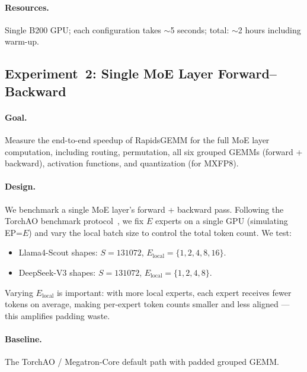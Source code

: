 \documentclass[11pt,a4paper]{article}
\theoremstyle{definition}
\begin{document}
\paragraph{Resources.}
Single B200 GPU; each configuration takes $\sim$5 seconds;
total: $\sim$2 hours including warm-up.

\subsection{Experiment~2: Single MoE Layer Forward--Backward}
\label{sec:exp-layer}

\paragraph{Goal.}
Measure the end-to-end speedup of RapidsGEMM for the full MoE layer
computation, including routing, permutation, all six grouped GEMMs
(forward + backward), activation functions, and quantization
(for MXFP8).

\paragraph{Design.}
We benchmark a single MoE layer's forward + backward pass.
Following the TorchAO benchmark
protocol~\cite{torchao2025}, we fix $E$ experts on a single GPU
(simulating EP=$E$) and vary the local batch size to control the
total token count.
We test:
\begin{itemize}
  \item Llama4-Scout shapes: $S = 131072$, $E_{\text{local}} = \{1, 2, 4, 8, 16\}$.
  \item DeepSeek-V3 shapes: $S = 131072$, $E_{\text{local}} = \{1, 2, 4, 8\}$.
\end{itemize}
Varying $E_{\text{local}}$ is important: with more local experts,
each expert receives fewer tokens on average, making per-expert
token counts smaller and less aligned --- this amplifies padding waste.

\paragraph{Baseline.}
The TorchAO / Megatron-Core default path with padded grouped GEMM.
\end{document}
